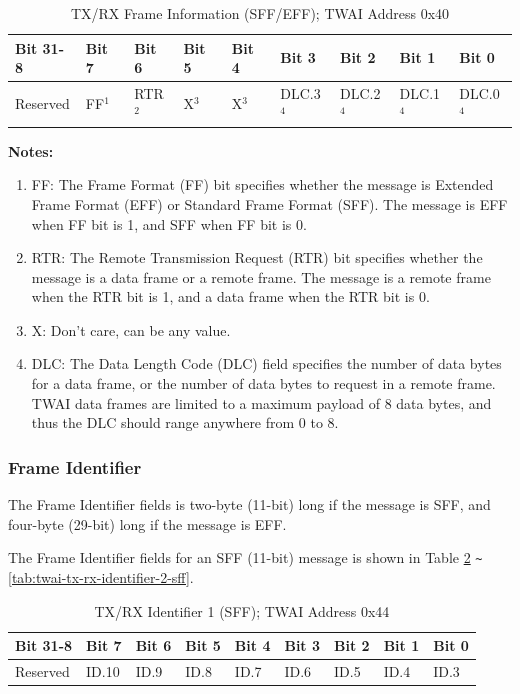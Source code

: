 \documentclass[main\_\_EN.tex]{subfiles}
\begin{document}
\begin{longtable}[c]{|p{1.4cm}|p{1.4cm}|p{1.4cm}|p{1.4cm}|p{1.4cm}|p{1.4cm}|p{1.4cm}|p{1.4cm}|p{1.4cm}|}
    \caption{TX/RX Frame Information (SFF/EFF); TWAI Address 0x40}
    \label{tab:twai-tx-rx-frame-info-sff-eff}\\
    \hline
       \rowcolor{lightgray}
    \textbf{Bit 31-8} & \textbf{Bit 7} & \textbf{Bit 6} & \textbf{Bit 5} & \textbf{Bit 4} & \textbf{Bit 3} & \textbf{Bit 2} & \textbf{Bit 1} & \textbf{Bit 0}\\\hline
    Reserved & FF$^1$ & RTR$^2$  & X$^3$  & X$^3$  & DLC.3$^4$ & DLC.2$^4$ & DLC.1$^4$ & DLC.0$^4$\\
    \hline
\end{longtable}
\vspace{-1.5em}
{\bfseries Notes:}\\
\begin{enumerate}
    \item FF: The Frame Format (FF) bit specifies whether the message is Extended Frame Format (EFF) or Standard Frame Format (SFF). The message is EFF when FF bit is 1, and SFF when FF bit is 0.
    \item RTR: The Remote Transmission Request (RTR) bit specifies whether the message is a data frame or a remote frame. The message is a remote frame when the RTR bit is 1, and a data frame when the RTR bit is 0.
    \item X: Don't care, can be any value.
    \item DLC: The Data Length Code (DLC) field specifies the number of data bytes for a data frame, or the number of data bytes to request in a remote frame. TWAI data frames are limited to a maximum payload of 8 data bytes, and thus the DLC should range anywhere from 0 to 8.
\end{enumerate}


\subsubsection{Frame Identifier}
The Frame Identifier fields is two-byte (11-bit) long if the message is SFF, and four-byte (29-bit) long if the message is EFF.

The Frame Identifier fields for an SFF (11-bit) message is shown in Table \ref{tab:twai-tx-rx-identifier-1-sff} \verb+~+ \ref{tab:twai-tx-rx-identifier-2-sff}. 

\begin{longtable}[c]{|p{1.4cm}|p{1.4cm}|p{1.4cm}|p{1.4cm}|p{1.4cm}|p{1.4cm}|p{1.4cm}|p{1.4cm}|p{1.4cm}|}
    \caption{TX/RX Identifier 1 (SFF); TWAI Address 0x44}
    \label{tab:twai-tx-rx-identifier-1-sff}\\
    \hline
    \rowcolor{lightgray}
    \textbf{Bit 31-8} & \textbf{Bit 7} & \textbf{Bit 6} & \textbf{Bit 5} & \textbf{Bit 4} & \textbf{Bit 3} & \textbf{Bit 2} & \textbf{Bit 1} & \textbf{Bit 0}\\\hline
    
    Reserved & ID.10 & ID.9 & ID.8 & ID.7 & ID.6 & ID.5 & ID.4 & ID.3\\
    \hline
\end{longtable}
\end{document}
